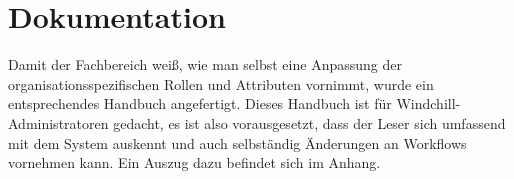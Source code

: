 \section{Dokumentation}
\label{sec:Dokumentation}

Damit der Fachbereich weiß, wie man selbst eine Anpassung der organisationsspezifischen Rollen und Attributen vornimmt, wurde ein entsprechendes Handbuch angefertigt.
Dieses Handbuch ist für Windchill-Administratoren gedacht, es ist also vorausgesetzt, dass der Leser sich umfassend mit dem System auskennt und auch selbständig Änderungen an \zB Workflows vornehmen kann.
Ein Auszug dazu befindet sich im Anhang.
